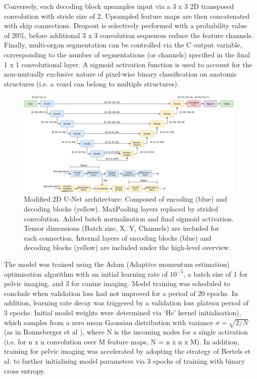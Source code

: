 Conversely, each decoding block upsamples input via a 3 x 3 2D transposed convolution with stride size of 2. Upsampled feature maps are then concatenated with skip connections. Dropout is selectively performed with a probability value of 20\%, before additional 3 x 3 convolution sequences reduce the feature channels. Finally, multi-organ segmentation can be controlled via the C output variable, corresponding to the number of segmentations (or channels) specified in the final 1 x 1 convolutional layer. A sigmoid activation function is used to account for the non-mutually exclusive nature
of pixel-wise binary classification on anatomic structures (i.e. a voxel can belong to multiple structures).

\begin{figure}[H]
	\begin{center}
		\hspace*{-1.3cm}\includegraphics[width=1.15\textwidth]{figures/model_diagram}
		\caption{Modified 2D U-Net architecture: Composed of encoding (blue) and decoding blocks (yellow). MaxPooling layers replaced by strided convolution. Added batch normalisation and final sigmoid activation. Tensor dimensions (Batch size, X, Y, Channels) are included for each connection. Internal layers of encoding blocks (blue) and decoding blocks (yellow) are included under the high-level overview.}
		\label{fig:model}
	\end{center}
\end{figure}

The model was trained using the Adam (Adaptive momentum estimation) optimisation algorithm \cite{kingma2014} with an initial learning rate of $10^{-5}$, a batch size of 1 for pelvic imaging, and 3 for canine imaging. Model training was scheduled to conclude when validation loss had not improved for a period of 20 epochs. In addition, learning rate decay was triggered by a validation loss plateau period of 3 epochs. Initial model weights were determined via `He' kernel initialisation), which samples from a zero mean Gaussian distribution with variance $\sigma=\sqrt{2/N}$ (as in Ronneberger et al \cite{Ronneberger_2015}), where N is the incoming nodes for a single activation (i.e. for n x n convolution over M feature maps, N = n x n x M). In addition, training for pelvic imaging was accelerated by adopting the strategy of Bertels et al. to further initialising model parameters via 3 epochs of training with binary cross entropy.

